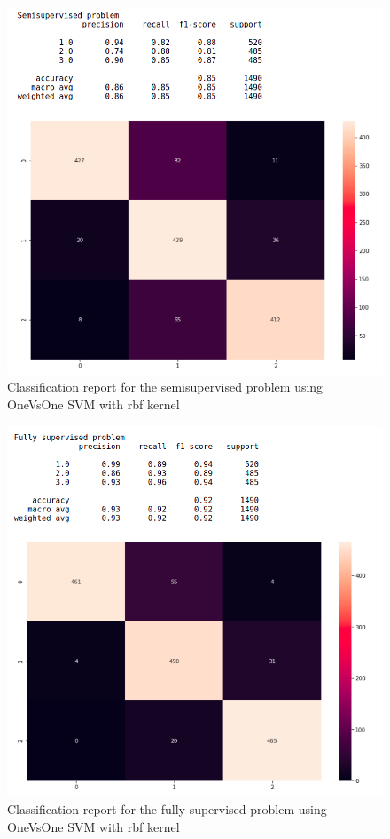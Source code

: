 \documentclass[a4paper,12pt]{article}
\begin{document}
\begin{figure}[H]
  \begin{center}
  \includegraphics[width=1.0\textwidth]{images/semi.png}
  \end{center}
  \caption{Classification report for the semisupervised problem using OneVsOne SVM with rbf kernel}
  \label{fig:semi}
\end{figure}

\begin{figure}[H]
  \begin{center}
  \includegraphics[width=1.0\textwidth]{images/fully.png}
  \end{center}
  \caption{Classification report for the fully supervised problem using OneVsOne SVM with rbf kernel}
  \label{fig:fully}
\end{figure}
\end{document}
